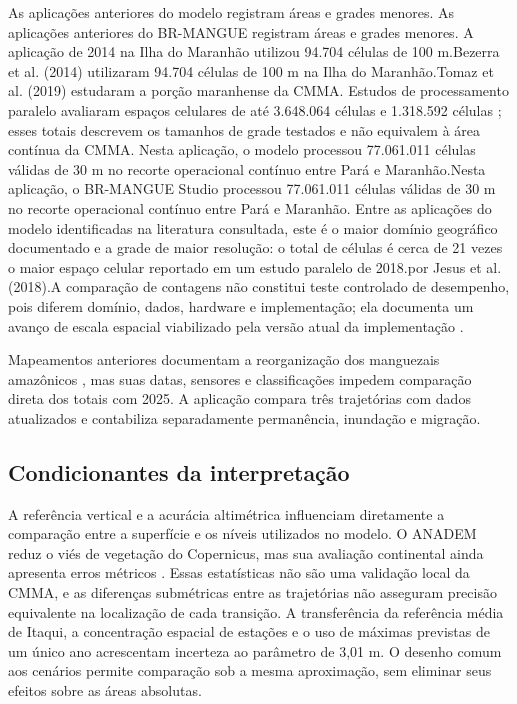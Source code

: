 \documentclass[12pt,a4paper]{article}
\begin{document}
\ifdefined\VersaoCega
As aplicações anteriores do modelo registram áreas e grades menores.
\else
As aplicações anteriores do BR-MANGUE registram áreas e grades menores.
\fi
\ifdefined\VersaoCega A aplicação de 2014 na Ilha do Maranhão utilizou 94.704 células de 100 m.\else Bezerra et al. (2014) utilizaram 94.704 células de 100 m na Ilha do Maranhão.\fi\space Tomaz et al. (2019) estudaram a porção maranhense da CMMA. Estudos de processamento paralelo avaliaram espaços celulares de até 3.648.064 células \citep{jesus2018} e 1.318.592 células \citep{carreiro2022}; esses totais descrevem os tamanhos de grade testados e não equivalem à área contínua da CMMA.
\ifdefined\VersaoCega Nesta aplicação, o modelo processou 77.061.011 células válidas de 30 m no recorte operacional contínuo entre Pará e Maranhão.\else Nesta aplicação, o BR-MANGUE Studio processou 77.061.011 células válidas de 30 m no recorte operacional contínuo entre Pará e Maranhão.\fi\space
Entre as aplicações do modelo identificadas na literatura consultada, este é o maior domínio geográfico documentado e a grade de maior resolução: o total de células é cerca de 21 vezes o maior espaço celular reportado \ifdefined\VersaoCega em um estudo paralelo de 2018.\else por Jesus et al. (2018).\fi\space A comparação de contagens não constitui teste controlado de desempenho, pois diferem domínio, dados, hardware e implementação; ela documenta um avanço de escala espacial viabilizado pela versão atual da implementação \citep{bezerra2014,tomaz2019,jesus2018,carreiro2022}.

Mapeamentos anteriores documentam a reorganização dos manguezais amazônicos \citep{cohen2003,cohen2018,nascimento2013,souzafilho2005}, mas suas datas, sensores e classificações impedem comparação direta dos totais com 2025. A aplicação compara três trajetórias com dados atualizados e contabiliza separadamente permanência, inundação e migração.

\subsection{Condicionantes da interpretação}
A referência vertical e a acurácia altimétrica influenciam diretamente a comparação entre a superfície e os níveis utilizados no modelo. O ANADEM reduz o viés de vegetação do Copernicus, mas sua avaliação continental ainda apresenta erros métricos \citep{laipelt2024}. Essas estatísticas não são uma validação local da CMMA, e as diferenças submétricas entre as trajetórias não asseguram precisão equivalente na localização de cada transição. A transferência da referência média de Itaqui, a concentração espacial de estações e o uso de máximas previstas de um único ano acrescentam incerteza ao parâmetro de 3,01 m. O desenho comum aos cenários permite comparação sob a mesma aproximação, sem eliminar seus efeitos sobre as áreas absolutas.
\end{document}
